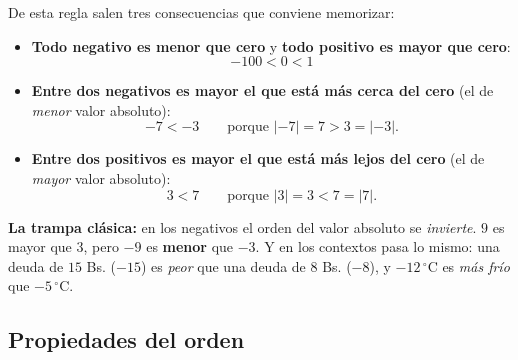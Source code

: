 \documentclass[12pt, letterpaper]{article}
\begin{document}
\begin{center}
\end{center}

\noindent De esta regla salen tres consecuencias que conviene memorizar:

\begin{cuadroextra}
  \begin{itemize}
    \item \textbf{Todo negativo es menor que cero} y \textbf{todo positivo es mayor que cero}:
          \[
            -100 < 0 < 1
          \]
    \item \textbf{Entre dos negativos es mayor el que está más cerca del cero} (el de \emph{menor} valor absoluto):
          \[
            -7 < -3 \qquad \text{porque } |-7| = 7 > 3 = |-3|.
          \]
    \item \textbf{Entre dos positivos es mayor el que está más lejos del cero} (el de \emph{mayor} valor absoluto):
          \[
            3 < 7 \qquad \text{porque } |3| = 3 < 7 = |7|.
          \]
  \end{itemize}
\end{cuadroextra}

\begin{cuadroadvertencia}
  \textbf{La trampa clásica:} en los negativos el orden del valor absoluto se \emph{invierte}. $9$ es mayor que $3$, pero $-9$ es \textbf{menor} que $-3$. Y en los contextos pasa lo mismo: una deuda de $15$ Bs. ($-15$) es \emph{peor} que una deuda de $8$ Bs. ($-8$), y $-12\,^{\circ}$C es \emph{más frío} que $-5\,^{\circ}$C.
\end{cuadroadvertencia}

\subsection{Propiedades del orden}
\end{document}
